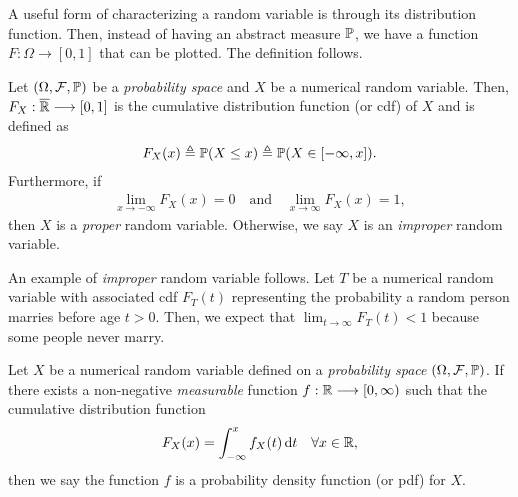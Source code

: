 A useful form of characterizing a random variable is through its distribution function.
%
Then, instead of having an abstract measure $\P$, we have a function $F:\Omega\longrightarrow[0,1]$ that can be plotted.
%
The definition follows.
%
\begin{definition}
    Let $(\Omega,\cal{F},\P)$ be a \textit{probability space} and $X$ be a numerical random variable. Then, $F_X:\overline\R\longrightarrow [0,1]$ is the cumulative distribution function (or cdf) of $X$ and is defined as
    \begin{align*}
        F_X(x) \triangleq \P(X \le x) \triangleq \P(X \in [-\infty,x]).
    \end{align*}
    Furthermore, if \vspace{-5mm}
    \begin{align*}
        \lim_{x\to-\infty} F_X(x) = 0 \quad\text{and}\quad \lim_{x\to\infty} F_X(x) = 1,
    \end{align*}
    then $X$ is a \textit{proper} random variable. Otherwise, we say $X$ is an \textit{improper} random variable.
\end{definition}

An example of \textit{improper} random variable follows.
%
Let $T$ be a numerical random variable with associated cdf $F_T(t)$ representing the probability a random person marries before age $t > 0$. Then, we expect that $\displaystyle\lim_{t\to\infty}F_T(t) < 1$ because some people never marry.


\begin{definition} \label{def:pdf}
    Let $X$ be a numerical random variable defined on a \textit{probability space} $(\Omega, \cal F, \P)$. If there exists a non-negative \textit{measurable} function ${f:\R \longrightarrow [0,\infty)}$ such that the cumulative distribution function
    \begin{align*}
        F_X(x) = \int_{-\infty}^x f_X(t) \,\d t \quad \forall x \in \R,
    \end{align*}
    then we say the function $f$ is a probability density function (or pdf) for $X$.
\end{definition}

